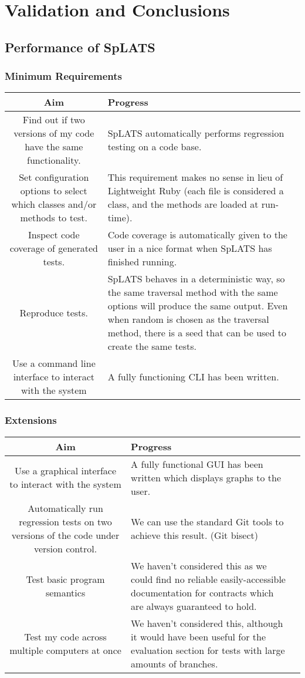 \chapter{Validation and Conclusions}
\section{Performance of SpLATS}
  \subsection{Minimum Requirements}
    \begin{tabular}{| c | p{\colwidth} |}
    \hline
    \textbf{Aim} & \textbf{Progress} \\
    \hline
    Find out if two versions of my code have the same functionality. &
    SpLATS automatically performs regression testing on a code base. \\
    \hline
    Set configuration options to select which classes and/or methods to test. &
    This requirement makes no sense in lieu of Lightweight Ruby (each file is considered a class, and the methods are loaded at run-time). \\
    \hline
    Inspect code coverage of generated tests. &
    Code coverage is automatically given to the user in a nice format when SpLATS has finished running. \\
    \hline
    Reproduce tests. &
    SpLATS behaves in a deterministic way, so the same traversal method with the same options will produce the same output. Even when random is chosen as the traversal method, there is a seed that can be used to create the same tests. \\
    \hline
    Use a command line interface to interact with the system &
    A fully functioning CLI has been written. \\
    \hline
    \end{tabular}
  \subsection{Extensions}
    \begin{tabular}{| c | p{\colwidth} | p{\colwidth} |}
    \hline
    \textbf{Aim} & \textbf{Progress} \\
    \hline
    Use a graphical interface to interact with the system &
    A fully functional GUI has been written which displays graphs to the user. \\
    \hline
    Automatically run regression tests on two versions of the code under version control. &
    We can use the standard Git tools to achieve this result. (Git bisect) \\
    \hline
    Test basic program semantics &
    We haven't considered this as we could find no reliable easily-accessible documentation for contracts which are always guaranteed to hold. \\
    \hline
    Test my code across multiple computers at once &
    We haven't considered this, although it would have been useful for the evaluation section for tests with large amounts of branches. \\
    \hline
    \end{tabular}
